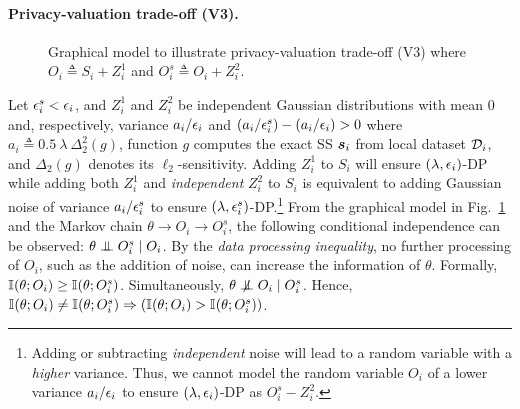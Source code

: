 \documentclass{article}
\theoremstyle{plain}
\theoremstyle{definition}
\theoremstyle{remark}
\begin{document}
\paragraph{Privacy-valuation trade-off (V3).}

\begin{figure}[ht]
 \begin{center}
 \end{center}
  \caption{Graphical model to illustrate privacy-valuation trade-off (V3) where $O_i \triangleq S_i + Z^1_i$ and $O^s_i \triangleq O_i + Z^2_i$. }\label{fig:gm1}
\end{figure}

Let ${\epsilon}_i^s < {\epsilon}_i$, and
$Z^1_i$ and $Z^2_i$ be independent Gaussian distributions with mean $0$ and, respectively, variance ${a_i}/{{\epsilon}_i}$ and $({a_i}/{{\epsilon}^s_i}) - ({a_i}/{{\epsilon}_i}) > 0$ where $a_i \triangleq 0.5\ \lambda\ \Delta_2^2(g)$, function $g$ computes the exact SS ${\bm{s}}_i$ from local dataset ${\mathcal{D}}_i$, and $\Delta_2(g)$ denotes its $\ell_2$-sensitivity.
Adding $Z^1_i$ to $S_i$ will ensure $(\lambda,{\epsilon}_i)$-DP while adding both $Z^1_i$ and \emph{independent} $Z^2_i$ to $S_i$ is equivalent to adding Gaussian noise of variance ${a_i}/{{\epsilon}^s_i}$ to ensure $(\lambda,{\epsilon}^s_i)$-DP.\footnote{Adding or subtracting \emph{independent} noise will lead to a random variable with a \emph{higher} variance. Thus, we cannot model the random variable $O_i$ of a lower variance ${a_i}/{{\epsilon}_i}$ to ensure $(\lambda,{\epsilon}_i)$-DP as $O^s_i - Z_i^2$.} 
From the graphical model in Fig.~\ref{fig:gm1} and the Markov chain $\theta \rightarrow O_i \rightarrow O^s_i$, the following conditional independence can be observed: $\theta \mathrel{\perp\mspace{-10mu}\perp} O^s_i \mid O_i$. By the \emph{data processing inequality}, no further processing of $O_i$, such as the addition of noise, can increase the information of $\theta$. Formally, $\mathbb{I}\hspace{-0.5mm}\left(\theta; O_i\right) \geq \mathbb{I}\hspace{-0.5mm}\left(\theta; O^s_i\right)$.
Simultaneously, $\theta \nCI O_i \mid O^s_i$. Hence, $\mathbb{I}\hspace{-0.5mm}\left(\theta; O_i\right) \neq \mathbb{I}\hspace{-0.5mm}\left(\theta; O^s_i\right) \Rightarrow (\mathbb{I}\hspace{-0.5mm}\left(\theta; O_i\right) > \mathbb{I}\hspace{-0.5mm}\left(\theta; O^s_i\right))$.
\end{document}
